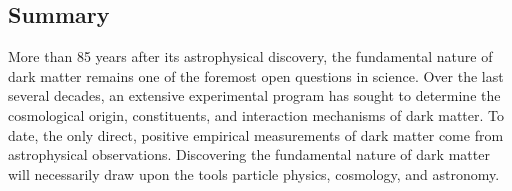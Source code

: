 \documentclass[12pt]{article}
\begin{document}
\pagebreak


\subsection*{Summary}

More than 85 years after its astrophysical discovery, the fundamental nature of dark matter remains one of the foremost open questions in science.
Over the last several decades, an extensive experimental program has sought to determine the cosmological origin, constituents, and interaction mechanisms of dark matter. 
To date, the only direct, positive empirical measurements of dark matter come from astrophysical observations.
Discovering the fundamental nature of dark matter will necessarily draw upon the tools particle physics, cosmology, and astronomy.
\end{document}
